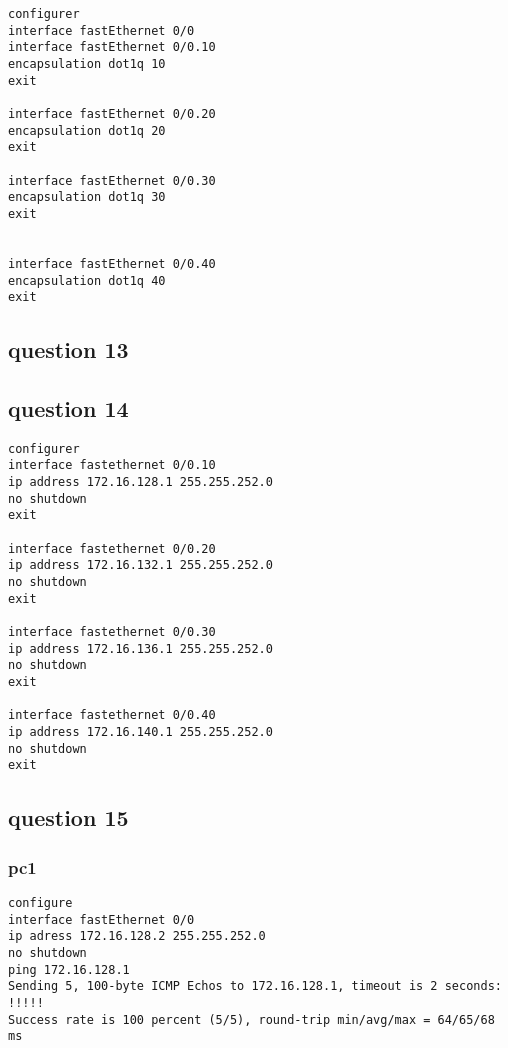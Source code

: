 \documentclass[11pt]{article}
\begin{document}
\begin{verbatim}
configurer
interface fastEthernet 0/0
interface fastEthernet 0/0.10
encapsulation dot1q 10
exit

interface fastEthernet 0/0.20
encapsulation dot1q 20
exit

interface fastEthernet 0/0.30
encapsulation dot1q 30
exit


interface fastEthernet 0/0.40
encapsulation dot1q 40
exit
\end{verbatim}



\subsection{question 13}
\label{sec:orgheadline29}



\subsection{question 14}
\label{sec:orgheadline30}

\begin{verbatim}
configurer
interface fastethernet 0/0.10
ip address 172.16.128.1 255.255.252.0
no shutdown
exit

interface fastethernet 0/0.20
ip address 172.16.132.1 255.255.252.0
no shutdown
exit

interface fastethernet 0/0.30
ip address 172.16.136.1 255.255.252.0
no shutdown
exit

interface fastethernet 0/0.40
ip address 172.16.140.1 255.255.252.0
no shutdown
exit
\end{verbatim}

\subsection{question 15}
\label{sec:orgheadline35}

\subsubsection{pc1}
\label{sec:orgheadline31}

\begin{verbatim}
configure
interface fastEthernet 0/0
ip adress 172.16.128.2 255.255.252.0
no shutdown
ping 172.16.128.1
Sending 5, 100-byte ICMP Echos to 172.16.128.1, timeout is 2 seconds:
!!!!!
Success rate is 100 percent (5/5), round-trip min/avg/max = 64/65/68 ms
\end{verbatim}
\end{document}
